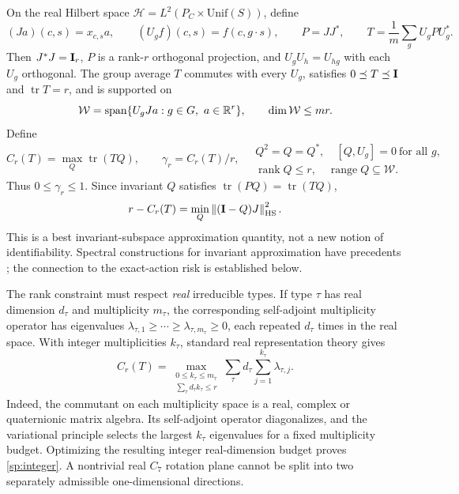 On the real Hilbert space $\mathcal H=L^2(P_C\times\mathrm{Unif}(S))$, define
\[
 (Ja)(c,s)=x_{c,s}a,\qquad (U_gf)(c,s)=f(c,g\cdot s),\qquad
 P=JJ^*,\qquad T=\frac1m\sum_gU_gPU_g^*.
\]
Then $J^*J=\mathbf{I}_r$, $P$ is a rank-$r$ orthogonal projection, and $U_gU_h=U_{hg}$ with each $U_g$ orthogonal. The group average $T$ commutes with every $U_g$, satisfies $0\preceq T\preceq\mathbf{I}$ and $\operatorname{tr}T=r$, and is supported on
\[
 \mathcal W=\operatorname{span}\{U_gJa:g\in G,\ a\in\mathbb{R}^r\},\qquad \dim\mathcal W\le mr.
\]
Define
\begin{equation}
 C_r(T)=\max_{Q}\operatorname{tr}(TQ),\qquad \gamma_r=C_r(T)/r,
 \quad
 \begin{gathered}
 Q^2=Q=Q^*,\quad [Q,U_g]=0\ \text{for all }g,\\[-2pt]
 \operatorname{rank}Q\le r,\quad\operatorname{range}Q\subseteq\mathcal W.
 \end{gathered}
 \label{sp:budget}
\end{equation}
Thus $0\le\gamma_r\le1$. Since invariant $Q$ satisfies $\operatorname{tr}(PQ)=\operatorname{tr}(TQ)$,
\[
 r-C_r(T)=\min_Q\left\lVert (\mathbf{I}-Q)J\right\rVert_{\mathrm{HS}}^2.
\]
This is a best invariant-subspace approximation quantity, not a new notion of identifiability. Spectral constructions for invariant approximation have precedents \citep{barbieri2020approximation}; the connection to the exact-action risk is established below.

The rank constraint must respect \emph{real} irreducible types. If type $\tau$ has real dimension $d_\tau$ and multiplicity $m_\tau$, the corresponding self-adjoint multiplicity operator has eigenvalues $\lambda_{\tau,1}\ge\cdots\ge\lambda_{\tau,m_\tau}\ge0$, each repeated $d_\tau$ times in the real space. With integer multiplicities $k_\tau$, standard real representation theory \citep{serre1977linear} gives
\begin{equation}
 C_r(T)=\max_{\substack{0\le k_\tau\le m_\tau\\\sum_\tau d_\tau k_\tau\le r}}
 \sum_\tau d_\tau\sum_{j=1}^{k_\tau}\lambda_{\tau,j}.
 \label{sp:integer}
\end{equation}
Indeed, the commutant on each multiplicity space is a real, complex or quaternionic matrix algebra. Its self-adjoint operator diagonalizes, and the variational principle selects the largest $k_\tau$ eigenvalues for a fixed multiplicity budget. Optimizing the resulting integer real-dimension budget proves \cref{sp:integer}. A nontrivial real $C_7$ rotation plane cannot be split into two separately admissible one-dimensional directions.

